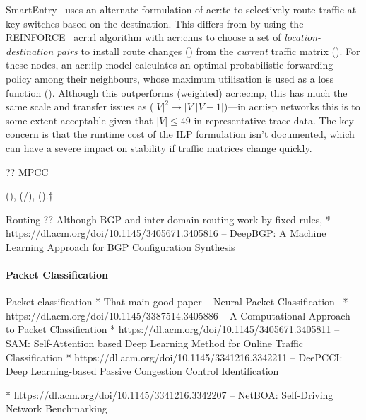 SmartEntry\littrace~\parencite{DBLP:conf/sigcomm/00010YC20} uses an alternate formulation of \gls{acr:te} to selectively route traffic at key switches based on the destination.
This differs from \citeauthor{DBLP:conf/hotnets/ValadarskySST17} by using the REINFORCE~\parencite{DBLP:journals/ml/Williams92} \gls{acr:rl} algorithm with \glspl{acr:cnn} to choose a set of \emph{location-destination pairs} to install route changes (\rllitact) from the \emph{current} traffic matrix (\rllitstate).
For these nodes, an \gls{acr:ilp} model calculates an optimal probabilistic forwarding policy among their neighbours, whose maximum utilisation is used as a loss function (\rllitreward).
Although this outperforms (weighted) \gls{acr:ecmp}, this has much the same scale and transfer issues as \citeauthor{DBLP:conf/hotnets/ValadarskySST17} ($|V|^2\rightarrow|V||V-1|$)---in \gls{acr:isp} networks this is to some extent acceptable given that $|V|\leq49$ in representative trace data.
The key concern is that the runtime cost of the ILP formulation isn't documented, which can have a severe impact on stability if traffic matrices change quickly.

?? MPCC~\parencite{DBLP:conf/conext/GiladSGRS20}

(\rllitstate), (\rllitact/\rllitactreal), (\rllitreward).$\dagger$



Routing
?? Although BGP and inter-domain routing work by fixed rules,
* https://dl.acm.org/doi/10.1145/3405671.3405816 -- DeepBGP: A Machine Learning Approach for BGP Configuration Synthesis

\paragraph{Packet Classification}
Packet classification
* That main good paper -- Neural Packet Classification~\parencite{DBLP:conf/sigcomm/LiangZJS19}
* https://dl.acm.org/doi/10.1145/3387514.3405886 -- A Computational Approach to Packet Classification
* https://dl.acm.org/doi/10.1145/3405671.3405811 -- SAM: Self-Attention based Deep Learning Method for Online Traffic Classification
* https://dl.acm.org/doi/10.1145/3341216.3342211 -- DeePCCI: Deep Learning-based Passive Congestion Control Identification

* https://dl.acm.org/doi/10.1145/3341216.3342207 -- NetBOA: Self-Driving Network Benchmarking

